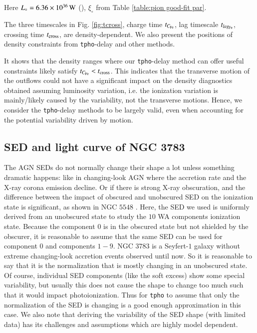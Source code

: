 \documentclass{aa}
\begin{document}
Here $L_{\circ} = 6.36 \times 10^{36} \, \rm W$ (\citealp{Mehdipour2017A&A}), $\xi_{\circ}$ from Table \ref{table:pion good-fit par}.


The three timescales in Fig. \ref{fig:tcross}, charge time $t_{C_{\rm Fe}}$, lag timescale $t_{lag_{\rm Fe}}$, crossing time $t_{\rm cross}$, are density-dependent.
We also present the positions of density constraints from \texttt{tpho}-delay and other methods.

 
It shows that the density ranges where our \texttt{tpho}-delay method can offer useful constraints likely satisfy $t_{C_{\rm Fe}} < t_{\rm cross}$.
This indicates that the transverse motion of the outflows could not have a significant impact on the density diagnostics obtained assuming luminosity variation, i.e. the ionization variation is mainly/likely caused by the variability, not the transverse motions.
Hence, we consider the \texttt{tpho}-delay methods to be largely valid, even when accounting for the potential variability driven by motion.

%



\subsection{SED and light curve of NGC 3783}

The AGN SEDs do not normally change their shape a lot unless something dramatic happens: like in changing-look AGN where the accretion rate and the X-ray corona emission decline. 
Or if there is strong X-ray obscuration, and the difference between the impact of obscured and unobscured SED on the ionization state is significant, as shown in NGC $5548$ \citep{Mehdipour2016A&A}.
Here, the SED we used is uniformly derived from an unobscured state to study the $10$ WA components ionization state.
Because the component $0$ is in the obscured state but not shielded by the obscurer, it is reasonable to assume that the same SED can be used for component $0$ and components $1-9$.
NGC $3783$ is a Seyfert-$1$ galaxy without extreme changing-look accretion events observed until now. 
So it is reasonable to say that it is the normalization that is mostly changing in an unobscured state. 
Of course, individual SED components (like the soft excess) show some special variability, but usually this does not cause the shape to change too much such that it would impact photoionization. 
Thus for \texttt{tpho} to assume that only the normalization of the SED is changing is a good enough approximation in this case. 
We also note that deriving the variability of the SED shape (with limited data) has its challenges and assumptions which are highly model dependent.
\end{document}
